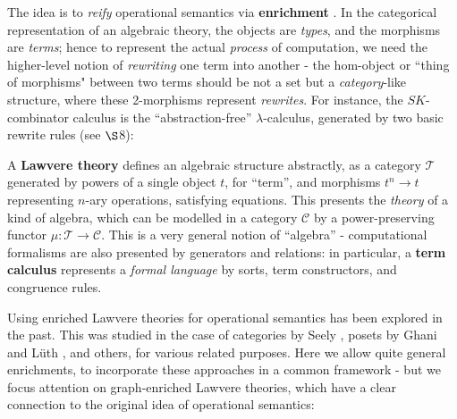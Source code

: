 \documentclass[a4paper,UKenglish]{article}
\theoremstyle{definition}
\newcommand{\C}{\mathscr{C}}
\newcommand{\T}{\mathscr{T}}
\begin{document}
The idea is to \textit{reify} operational semantics via \textbf{enrichment} \cite{enrich}. In the categorical representation of an algebraic theory, the objects are \textit{types}, and the morphisms are \textit{terms}; hence to represent the actual \textit{process} of computation, we need the higher-level notion of \textit{rewriting} one term into another - the hom-object or ``thing of morphisms" between two terms should be not a set but a \textit{category}-like structure, where these 2-morphisms represent \textit{rewrites}. For instance, the $SK$-combinator calculus is the ``abstraction-free'' $\lambda$-calculus, generated by two basic rewrite rules (see $\S$8):

\begin{center}
	\begin{minipage}{.2 \textwidth}
	\end{minipage}\qquad \qquad
	\begin{minipage}{.2 \textwidth}
	\end{minipage}
\end{center}

A \textbf{Lawvere theory} \cite{lawvere} defines an algebraic structure abstractly, as a category $\T$ generated by powers of a single object $t$, for ``term'', and morphisms $t^n \to t$ representing $n$-ary operations, satisfying equations. This presents the \textit{theory} of a kind of algebra, which can be modelled in a category $\C$ by a power-preserving functor $\mu:\T \to \C$. This is a very general notion of ``algebra'' - computational formalisms are also presented by generators and relations: in particular, a \textbf{term calculus} represents a \textit{formal language} by sorts, term constructors, and congruence rules.

Using enriched Lawvere theories for operational semantics has been explored in the past. This was studied in the case of categories by Seely \cite{seely}, posets by Ghani and L\"uth \cite{ghani}, and others, for various related purposes. Here we allow quite general enrichments, to incorporate these approaches in a common framework - but we focus attention on graph-enriched Lawvere theories, which have a clear connection to the original idea of operational semantics:
\end{document}

